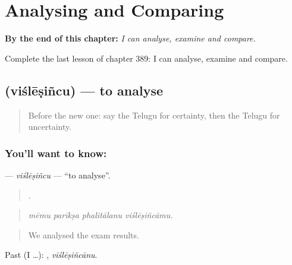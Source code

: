 
\chapter{Analysing and Comparing}
\label{ch:te-analysing-and-comparing}

\begin{chapteropening}
\textbf{By the end of this chapter:} \emph{I can analyse, examine and compare.}

Complete the last lesson of chapter 389: I can analyse, examine and compare.
\end{chapteropening}

\section[\texorpdfstring{\te{విశ్లేషించు} (viślēṣiñcu)}{విశ్లేషించు (viślēṣiñcu)}]{ (viślēṣiñcu) — to analyse}

\label{lesson:TE-C389-vislesincu}



\begin{quote}
Before the new one: say the Telugu for certainty, then the Telugu for uncertainty.
\end{quote}

\subsection*{You'll want to know: }
\textbf{} — \emph{viślēṣiñcu} — \textquotedblleft{}to analyse\textquotedblright{}.

\begin{quote}
   .
\end{quote}

\begin{quote}
\emph{mēmu parīkṣa phalitālanu viślēṣiñcāmu.}
\end{quote}

\begin{quote}
We analysed the exam results.
\end{quote}

Past (I …): , \emph{viślēṣiñcānu}.


